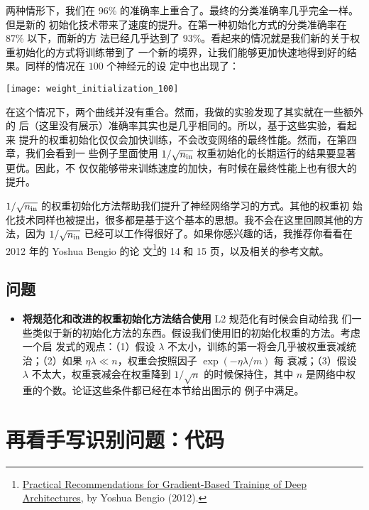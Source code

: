 两种情形下，我们在 96\% 的准确率上重合了。最终的分类准确率几乎完全一样。但是新的
初始化技术带来了速度的提升。在第一种初始化方式的分类准确率在 87\% 以下，而新的方
法已经几乎达到了 93\%。看起来的情况就是我们新的关于权重初始化的方式将训练带到了
一个新的境界，让我们能够更加快速地得到好的结果。同样的情况在 $100$ 个神经元的设
定中也出现了：
\begin{center}
    \texttt{[image: weight\_initialization\_100]}
\end{center}

在这个情况下，两个曲线并没有重合。然而，我做的实验发现了其实就在一些额外的%
\epochs{}后（这里没有展示）准确率其实也是几乎相同的。所以，基于这些实验，看起来
提升的权重初始化仅仅会加快训练，不会改变网络的最终性能。然而，在第四章，我们会看到一
些例子里面使用 $1/\sqrt{n_{\rm in}}$ 权重初始化的长期运行的结果要显著更优。因此，不
仅仅能够带来训练速度的加快，有时候在最终性能上也有很大的提升。

$1/\sqrt{n_{\rm in}}$ 的权重初始化方法帮助我们提升了神经网络学习的方式。其他的权重初
始化技术同样也被提出，很多都是基于这个基本的思想。我不会在这里回顾其他的方法，因为
$1/\sqrt{n_{\rm in}}$ 已经可以工作得很好了。如果你感兴趣的话，我推荐你看看在
2012 年的 Yoshua Bengio 的论
文\footnote{\href{http://arxiv.org/pdf/1206.5533v2.pdf}{Practical
    Recommendations for Gradient-Based Training of Deep Architectures}, by
  Yoshua Bengio (2012).  }的 14 和 15 页，以及相关的参考文献。

\subsection*{问题}

\begin{itemize}
\item \textbf{将规范化和改进的权重初始化方法结合使用} L2 规范化有时候会自动给我
  们一些类似于新的初始化方法的东西。假设我们使用旧的初始化权重的方法。考虑一个启
  发式的观点：（1）假设 $\lambda$ 不太小，训练的第一\epochs{}将会几乎被权重衰减统
  治；（2）如果 $\eta \lambda \ll n$，权重会按照因子 $\exp(-\eta \lambda / m)$ 每
  \epochs{}衰减；（3）假设 $\lambda$ 不太大，权重衰减会在权重降到 $1/\sqrt{n}$
  的时候保持住，其中 $n$ 是网络中权重的个数。论证这些条件都已经在本节给出图示的
  例子中满足。
\end{itemize}

\section{再看手写识别问题：代码}
\label{sec:handwriting_recognition_revisited_the_code}

